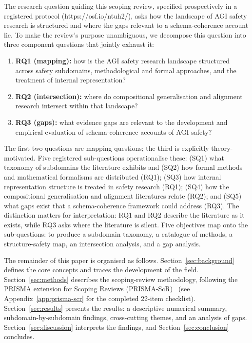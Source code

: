 The research question guiding this scoping review, specified prospectively in a registered protocol (https://osf.io/ntuh2/), asks how the landscape of AGI safety research is structured and where the gaps relevant to a schema-coherence account lie. To make the review's purpose unambiguous, we decompose this question into three component questions that jointly exhaust it:
\begin{enumerate}
\item \textbf{RQ1 (mapping):} how is the AGI safety research landscape structured across safety subdomains, methodological and formal approaches, and the treatment of internal representation?
\item \textbf{RQ2 (intersection):} where do compositional generalisation and alignment research intersect within that landscape?
\item \textbf{RQ3 (gaps):} what evidence gaps are relevant to the development and empirical evaluation of schema-coherence accounts of AGI safety?
\end{enumerate}
The first two questions are mapping questions; the third is explicitly theory-motivated. Five registered sub-questions operationalise these: (SQ1) what taxonomy of subdomains the literature exhibits and (SQ2) how formal methods and mathematical formalisms are distributed (RQ1); (SQ3) how internal representation structure is treated in safety research (RQ1); (SQ4) how the compositional generalisation and alignment literatures relate (RQ2); and (SQ5) what gaps exist that a schema-coherence framework could address (RQ3). The distinction matters for interpretation: RQ1 and RQ2 describe the literature as it exists, while RQ3 asks where the literature is silent. Five objectives map onto the sub-questions: to produce a subdomain taxonomy, a catalogue of methods, a structure-safety map, an intersection analysis, and a gap analysis.

The remainder of this paper is organised as follows. Section~\ref{sec:background} defines the core concepts and traces the development of the field. Section~\ref{sec:methods} describes the scoping-review methodology, following the PRISMA extension for Scoping Reviews (PRISMA-ScR)~\cite{tricco2018prismascr} (see Appendix~\ref{app:prisma-scr} for the completed 22-item checklist). Section~\ref{sec:results} presents the results: a descriptive numerical summary, subdomain-by-subdomain findings, cross-cutting themes, and an analysis of gaps. Section~\ref{sec:discussion} interprets the findings, and Section~\ref{sec:conclusion} concludes.

